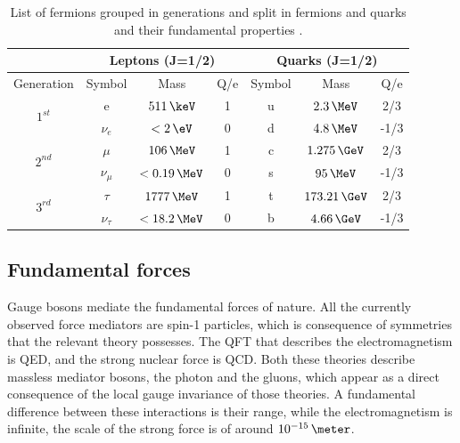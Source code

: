 \begin{table}[!htb]
\centering
\begin{tabular}{|c||c|c|c||c|c|c|}
\hline
 & \multicolumn{3}{c||}{Leptons (J=1/2)} & \multicolumn{3}{c|}{Quarks (J=1/2)} \\
\hline
Generation                &     Symbol &            Mass & Q/e & Symbol &           Mass & Q/e \\
\hline\hline
\multirow{2}{*}{$1^{st}$} & e          &     $511\,\keV$ &   1 &      u &    $2.3\,\MeV$ &  2/3 \\
                          & $\nu_e$    &     $< 2\, \eV$ &   0 &      d &    $4.8\,\MeV$ & -1/3 \\
\hline
\hline
\multirow{2}{*}{$2^{nd}$} & $\mu$      &  $   106\,\MeV$ &   1 &      c &  $1.275\,\GeV$ &  2/3 \\
                          & $\nu_\mu$  &  $< 0.19\,\MeV$ &   0 &      s &     $95\,\MeV$ & -1/3 \\
\hline
\hline
\multirow{2}{*}{$3^{rd}$} & $\tau$     & $   1777\,\MeV$ &   1 &      t & $173.21\,\GeV$ &  2/3 \\
                          & $\nu_\tau$ & $< 18.2 \,\MeV$ &   0 &      b &   $4.66\,\GeV$ & -1/3 \\
\hline
\end{tabular}
\caption[List of leptons and their fundamental properties]{List of fermions grouped in generations and split in fermions and quarks and their fundamental properties \cite{ARTICLE:PDG2014}.}
\label{TABLE:Theory_SM_ParticlesAndForces_MatterParticle}
\end{table}

\subsection{Fundamental forces}
\label{SUBSECTION:Theory_SM_FundamentalForces}


Gauge bosons mediate the fundamental forces of nature. All the currently observed force mediators are spin-1 particles, which is consequence of symmetries that the relevant theory possesses. The \gls{QFT} that describes the electromagnetism is \gls{QED}, and the strong nuclear force is \gls{QCD}. Both these theories describe massless mediator bosons, the photon and the gluons, which appear as a direct consequence of the local gauge invariance of those theories. A fundamental difference between these interactions is their range, while the electromagnetism is infinite, the scale of the strong force is of around $10^{-15}\,\meter$.

